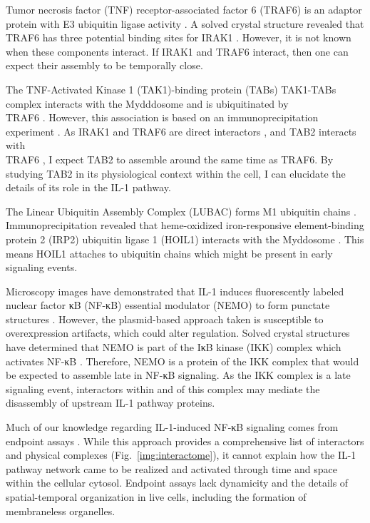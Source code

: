Tumor necrosis factor (TNF) receptor-associated factor 6 (TRAF6) is an adaptor protein with E3 ubiquitin ligase activity \autocite{Muzio_1997}\autocite{Cao_1996}\autocite{Naito_1999}. A solved crystal structure revealed that TRAF6 has three potential binding sites for IRAK1 \autocite{Ye_2002}. However, it is not known when these components interact. If IRAK1 and TRAF6 interact, then one can expect their assembly to be temporally close.
 
The TNF-Activated Kinase 1 (TAK1)-binding protein (TABs) TAK1-TABs complex interacts with the Mydddosome and is ubiquitinated by \\  TRAF6 \autocite{Deng_2000}\autocite{Wang_2001}\autocite{Kanayama_2004}\autocite{Wertz_2004}\autocite{Xia_2009}\autocite{Ajibade_2013}. However, this association is based on an immunoprecipitation experiment \autocite{Kanayama_2004}. As IRAK1 and TRAF6 are direct interactors \autocite{Ye_2002}, and TAB2 interacts with \\ TRAF6 \autocite{Deng_2000}\autocite{Wang_2001}\autocite{Kanayama_2004}\autocite{Wertz_2004}\autocite{Xia_2009}\autocite{Ajibade_2013}, I expect TAB2 to assemble around the same time as TRAF6. By studying TAB2 in its physiological context within the cell, I can elucidate the details of its role in the IL-1 pathway.
 
The Linear Ubiquitin Assembly Complex (LUBAC) forms M1 ubiquitin chains \autocite{Kirisako_2006}. Immunoprecipitation revealed that heme-oxidized iron-responsive element-binding protein 2 (IRP2) ubiquitin ligase 1 (HOIL1) interacts with the Myddosome \autocite{Kelsall_2019}. This means HOIL1 attaches to ubiquitin chains which might be present in early signaling events.
 
Microscopy images have demonstrated that IL-1 induces fluorescently labeled nuclear factor κB (NF-κB) essential modulator (NEMO) to form punctate structures \autocite{Tarantino_2014}. However, the plasmid-based approach taken is susceptible to overexpression artifacts, which could alter regulation. Solved crystal structures have determined that NEMO is part of the IκB kinase (IKK) complex which activates NF-κB \autocite{Rushe_2008}. Therefore, NEMO is a protein of the IKK complex that would be expected to assemble late in NF-κB signaling. As the IKK complex is a late signaling event, interactors within and of this complex may mediate the disassembly of upstream IL-1 pathway proteins.
 
Much of our knowledge regarding IL-1-induced NF-κB signaling comes from endpoint assays \autocite{Muzio_1997}\autocite{Lin_2010}\autocite{Moncrieffe_2020}\autocite{DeNardo_2018}\autocite{Wesche_1997}\autocite{Wu_2003}\autocite{Lo_2009}. While this approach provides a comprehensive list of interactors and physical complexes (Fig.~\ref{img:interactome}), it cannot explain how the IL-1 pathway network came to be realized and activated through time and space within the cellular cytosol. Endpoint assays lack dynamicity and the details of spatial-temporal organization in live cells, including the formation of membraneless organelles.

